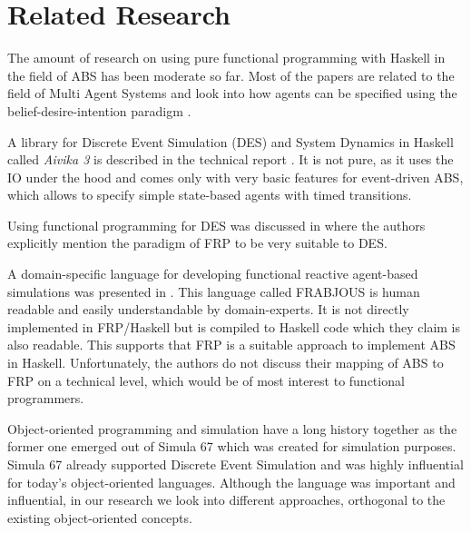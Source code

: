 \section{Related Research}
The amount of research on using pure functional programming with Haskell in the field of ABS has been moderate so far. Most of the papers are related to the field of Multi Agent Systems and look into how agents can be specified using the belief-desire-intention paradigm \citep{de_jong_suitability_2014, sulzmann_specifying_2007, jankovic_functional_2007}.

A library for Discrete Event Simulation (DES) and System Dynamics in Haskell called \textit{Aivika 3} is described in the technical report \citep{sorokin_aivika_2015}. It is not pure, as it uses the IO under the hood and comes only with very basic features for event-driven ABS, which allows to specify simple state-based agents with timed transitions.

Using functional programming for DES was discussed in \citep{jankovic_functional_2007} where the authors explicitly mention the paradigm of FRP to be very suitable to DES.

A domain-specific language for developing functional reactive agent-based simulations was presented in \citep{vendrov_frabjous:_2014}. This language called FRABJOUS is human readable and easily understandable by domain-experts. It is not directly implemented in FRP/Haskell but is compiled to Haskell code which they claim is also readable. This supports that FRP is a suitable approach to implement ABS in Haskell. Unfortunately, the authors do not discuss their mapping of ABS to FRP on a technical level, which would be of most interest to functional programmers.

Object-oriented programming and simulation have a long history together as the former one emerged out of Simula 67 \citep{dahl_birth_2002} which was created for simulation purposes. Simula 67 already supported Discrete Event Simulation and was highly influential for today's object-oriented languages. Although the language was important and influential, in our research we look into different approaches, orthogonal to the existing object-oriented concepts.

